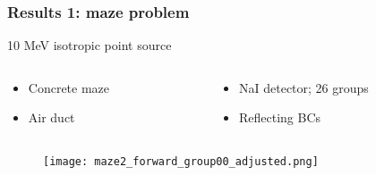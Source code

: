 \documentclass[handout]{beamer}
\renewcommand{\(}{\begin{columns}}
\renewcommand{\)}{\end{columns}}
\newcommand{\<}[1]{\begin{column}{#1}}
\renewcommand{\>}{\end{column}}
\begin{document}
\begin{frame}[fragile]

  \frametitle{Results 1: maze problem}
  10 MeV isotropic point source
  \begin{columns}
   \begin{column}{0.45\textwidth}
   \begin{itemize}
\item Concrete maze
\item Air duct
\end{itemize}
   \end{column}
  \begin{column}{0.5\textwidth}
   \begin{itemize}
\item NaI detector; 26 groups
\item Reflecting BCs
\end{itemize}
   \end{column}
\end{columns}
   \begin{figure}
   \texttt{[image: maze2\_forward\_group00\_adjusted.png]}
   \end{figure}


	
\end{frame}
\end{document}
